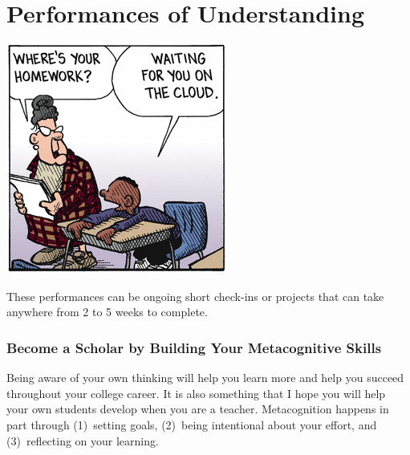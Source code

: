 \documentclass{tufte-handout}
\begin{document}
\newpage

\part{Performances of Understanding}

\begin{marginfigure}%
	\begin{center}
		\includegraphics[width=1\linewidth]{frazz-homework.png}
	\end{center}
\end{marginfigure}

 These performances can be ongoing short check-ins or projects that can take anywhere from 2 to 5 weeks to complete.

\section{Become a Scholar by Building Your Metacognitive Skills}
 Being aware of your own thinking will help you learn more and help you succeed throughout your college career. It is also something that I hope you will help your own students develop when you are a teacher. Metacognition happens in part through (1)~setting goals, (2)~being intentional about your effort, and (3)~reflecting on your learning.
\end{document}

